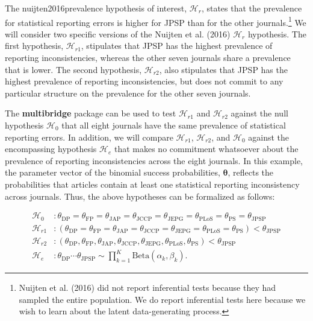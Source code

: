 \documentclass[
  english,
  man,floatsintext]{apa6}
\begin{document}
The nuijten2016prevalence hypothesis of interest, \(\mathcal{H}_r\), states that the prevalence for statistical reporting errors is higher for JPSP than for the other journals.\footnote{Nuijten et al. (2016) did not report inferential tests because they had sampled the entire population. We do report inferential tests here because we wish to learn about the latent data-generating process.} We will consider two specific versions of the Nuijten et al. (2016) \(\mathcal{H}_r\) hypothesis. The first hypothesis, \(\mathcal{H}_{r1}\), stipulates that JPSP has the highest prevalence of reporting inconsistencies, whereas the other seven journals share a prevalence that is lower. The second hypothesis, \(\mathcal{H}_{r2}\), also stipulates that JPSP has the highest prevalence of reporting inconsistencies, but does not commit to any particular structure on the prevalence for the other seven journals.

The \textbf{multibridge} package can be used to test \(\mathcal{H}_{r1}\) and \(\mathcal{H}_{r2}\) against the null hypothesis \(\mathcal{H}_0\) that all eight journals have the same prevalence of statistical reporting errors. In addition, we will compare \(\mathcal{H}_{r1}\), \(\mathcal{H}_{r2}\), and \(\mathcal{H}_0\) against the encompassing hypothesis \(\mathcal{H}_e\) that makes no commitment whatsoever about the prevalence of reporting inconsistencies across the eight journals. In this example, the parameter vector of the binomial success probabilities, \(\boldsymbol{\theta}\), reflects the probabilities that articles contain at least one statistical reporting inconsistency across journals. Thus, the above hypotheses can be formalized as follows:

\begin{align*}
    \mathcal{H}_0 &: \theta_{\text{DP}} = \theta_{\text{FP}} = \theta_{\text{JAP}} = \theta_{\text{JCCP}} = \theta_{\text{JEPG}} = \theta_{\text{PLoS}}= \theta_{\text{PS}} = \theta_{\text{JPSP}}\\
    \mathcal{H}_{r1} &: (\theta_{\text{DP}} = \theta_{\text{FP}} = \theta_{\text{JAP}} = \theta_{\text{JCCP}} = \theta_{\text{JEPG}} = \theta_{\text{PLoS}}= \theta_{\text{PS}}) < \theta_{\text{JPSP}} \\
    \mathcal{H}_{r2} &: (\theta_{\text{DP}}, \theta_{\text{FP}}, \theta_{\text{JAP}} , \theta_{\text{JCCP}} , \theta_{\text{JEPG}} , \theta_{\text{PLoS}}, \theta_{\text{PS}}) < \theta_{\text{JPSP}} \\
    \mathcal{H}_e &:  \theta_{\text{DP}} \cdots \theta_{\text{JPSP}} \sim \prod_{k = 1}^K \text{Beta}(\alpha_k, \beta_k).
\end{align*}
\end{document}
